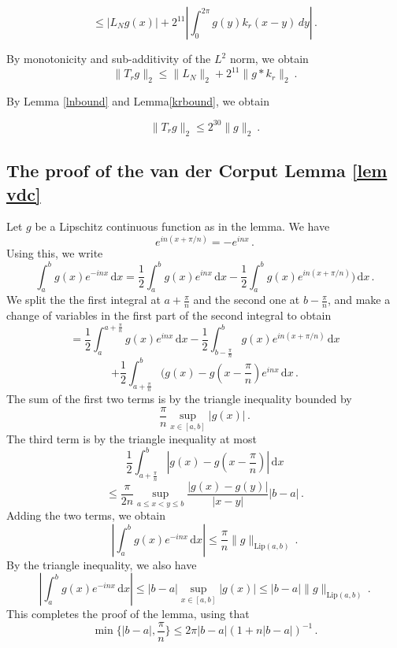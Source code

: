 {\begin{equation}
\le |L_Ng(x)|+ 2^{11}|\int_0^{2\pi} g(y) k_r(x-y)\, dy|\, .
\end{equation}

By monotonicity and sub-additivity of the $L^2$ norm, we obtain
\begin{equation}
    \|T_rg\|_2\le \|L_N\|_2+2^{11}\|g*k_r\|_2\ .
\end{equation}

By Lemma \ref{lnbound} and Lemma\ref{krbound}, we obtain

\begin{equation}
    \|T_rg\|_2\le 2^{30}\|g\|_2\ .
\end{equation}


\subsection{The proof of the van der Corput Lemma \ref{lem vdc}}
\label{10vandercorput}

Let $g$ be a Lipschitz continuous function as in the lemma. We have
$$
    e^{in(x + \pi/n)} = -e^{inx}\,.
$$
Using this, we write
$$
    \int_a^b g(x) e^{-inx} \, \mathrm{d}x
    = \frac{1}{2} \int_a^b g(x) e^{inx} \, \mathrm{d}x - \frac{1}{2} \int_a^b g(x) e^{in(x + \pi/n)}) \, \mathrm{d}x\,.
$$
We split the the first integral at $a + \frac{\pi}{n}$ and the second one at $b - \frac{\pi}{n}$, and make a change of variables in the first part of the second integral to obtain
$$
    = \frac{1}{2} \int_{a}^{a + \frac{\pi}{n}} g(x) e^{inx} \, \mathrm{d}x - \frac{1}{2} \int_{b - \frac{\pi}{n}}^{b} g(x) e^{in(x + \pi/n)} \, \mathrm{d}x
$$
$$
    + \frac{1}{2} \int_{a + \frac{\pi}{n}}^{b} (g(x) - g(x - \frac{\pi}{n}) e^{inx} \, \mathrm{d}x\,.
$$
The sum of the first two terms is by the triangle inequality bounded by
$$
    \frac{\pi}{n} \sup_{x \in [a,b]} |g(x)|\,.
$$
The third term is by the triangle inequality at most
$$
    \frac{1}{2} \int_{a + \frac{\pi}{n}}^b |g(x) - g(x - \frac{\pi}{n})| \, \mathrm{d}x
$$
$$
    \le \frac{\pi}{2n} \sup_{a \le x < y \le b} \frac{|g(x) - g(y)|}{|x-y|} |b-a|\,.
$$
Adding the two terms, we obtain
$$
    \left|\int_a^b g(x) e^{-inx} \, \mathrm{d}x\right| \le \frac{\pi}{n} \|g\|_{\mathrm{Lip}(a,b)}\,.
$$
By the triangle inequality, we also have
$$
    \left|\int_a^b g(x) e^{-inx} \, \mathrm{d}x\right| \le |b -a| \sup_{x \in [a,b]} |g(x)| \le |b-a| \|g\|_{\mathrm{Lip}(a,b)}\,.
$$
This completes the proof of the lemma, using that
$$
    \min\{|b-a|, \frac{\pi}{n}\} \le 2 \pi |b-a|(1 + n|b-a|)^{-1}\,.
$$





}
